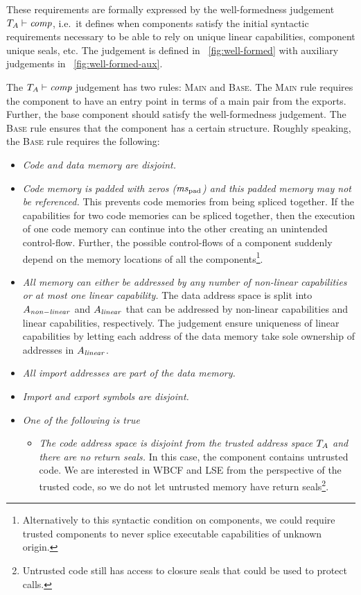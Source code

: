 \documentclass{jfp}
\renewcommand{\comp}{\var{comp}}
\newcommand{\wdjud}[2][ ]{#1 \vdash #2}
\newenvironment{jversion}{}{}
\begin{document}
\begin{jversion}
These requirements are formally expressed by the well-formedness judgement $\wdjud[\ta]{\comp}$, i.e.\ it defines when components satisfy the initial syntactic requirements necessary to be able to rely on unique linear capabilities, component unique seals, etc.
The judgement is defined in \figurename~\ref{fig:well-formed} with auxiliary judgements in \figurename~\ref{fig:well-formed-aux}.

The $\wdjud[\ta]{\comp}$ judgement has two rules: \textsc{Main} and \textsc{Base}.
The \textsc{Main} rule requires the component to have an entry point in terms of a main pair from the exports.
Further, the base component should satisfy the well-formedness judgement.
The \textsc{Base} rule ensures that the component has a certain structure.
Roughly speaking, the \textsc{Base} rule requires the following:
\begin{itemize}
\item \textit{Code and data memory are disjoint.}
\item \textit{Code memory is padded with zeros ($\mspad$) and this padded memory may not be referenced.}
  This prevents code memories from being spliced together.
  If the capabilities for two code memories can be spliced together, then the execution of one code memory can continue into the other creating an unintended control-flow.
  Further, the possible control-flows of a component suddenly depend on the memory locations of all the components\footnote{Alternatively to this syntactic condition on components, we could require trusted components to never splice executable capabilities of unknown origin.}.
\item \textit{All memory can either be addressed by any number of non-linear capabilities or at most one linear capability.}
  The data address space is split into $A_{\mathit{non-linear}}$ and $A_{\mathit{linear}}$ that can be addressed by non-linear capabilities and linear capabilities, respectively.
  The judgement ensure uniqueness of linear capabilities by letting each address of the data memory take sole ownership of addresses in $A_{\mathit{linear}}$.
\item \textit{All import addresses are part of the data memory.} 
\item \textit{Import and export symbols are disjoint.}
\item \textit{One of the following is true}
  \begin{itemize}
  \item \textit{The code address space is disjoint from the trusted address space $T_{A}$ and there are no return seals.} In this case, the component contains untrusted code. We are interested in WBCF and LSE from the perspective of the trusted code, so we do not let untrusted memory have return seals\footnote{Untrusted code still has access to closure seals that could be used to protect calls.}.

\end{itemize}
\end{itemize}
\end{jversion}
\end{document}
